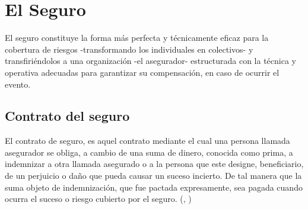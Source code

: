 



\section{El Seguro}	
\setlength{\parskip}{5mm}
	El seguro constituye la forma más perfecta y técnicamente eficaz para la cobertura de riesgos -transformando los individuales en colectivos- y transfiriéndolos a una organización -el asegurador- estructurada con la técnica y operativa adecuadas para garantizar su compensación, en caso de ocurrir el evento.
\setlength{\parskip}{0mm}

\subsection{Contrato del seguro}
\setlength{\parskip}{5mm}

	El contrato de seguro, es aquel contrato mediante el cual una persona llamada asegurador se obliga, a cambio de una suma de dinero, conocida como prima, a indemnizar a otra llamada asegurado o a la persona que este designe, beneficiario, de un perjuicio o daño que pueda causar un suceso incierto. De tal manera que la suma objeto de indemnización, que fue pactada expresamente, sea pagada cuando ocurra el suceso o riesgo cubierto por el seguro. (\citeauthor{contratobib}, \citeyear{contratobib})

\setlength{\parskip}{0mm}




